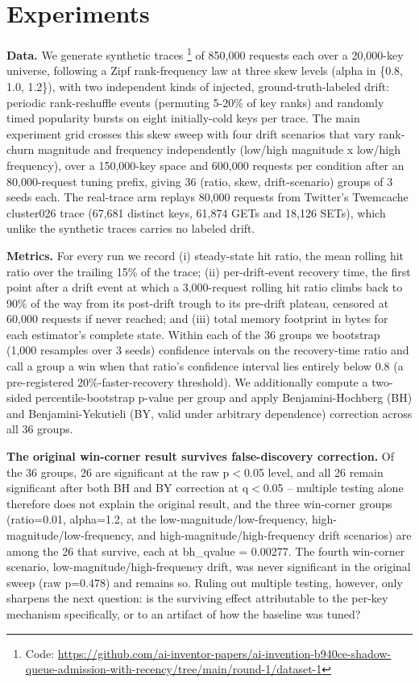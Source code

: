 \documentclass[11pt,letterpaper]{article}
\begin{document}
\section{Experiments}

\textbf{Data.} We generate synthetic traces \footnote{Code: \url{https://github.com/ai-inventor-papers/ai-invention-b940ce-shadow-queue-admission-with-recency/tree/main/round-1/dataset-1}} of 850,000 requests each over a 20,000-key universe, following a Zipf rank-frequency law at three skew levels (alpha in \{0.8, 1.0, 1.2\}), with two independent kinds of injected, ground-truth-labeled drift: periodic rank-reshuffle events (permuting 5-20\% of key ranks) and randomly timed popularity bursts on eight initially-cold keys per trace. The main experiment grid crosses this skew sweep with four drift scenarios that vary rank-churn magnitude and frequency independently (low/high magnitude x low/high frequency), over a 150,000-key space and 600,000 requests per condition after an 80,000-request tuning prefix, giving 36 (ratio, skew, drift-scenario) groups of 3 seeds each. The real-trace arm replays 80,000 requests from Twitter's Twemcache cluster026 trace (67,681 distinct keys, 61,874 GETs and 18,126 SETs), which unlike the synthetic traces carries no labeled drift.

\textbf{Metrics.} For every run we record (i) steady-state hit ratio, the mean rolling hit ratio over the trailing 15\% of the trace; (ii) per-drift-event recovery time, the first point after a drift event at which a 3,000-request rolling hit ratio climbs back to 90\% of the way from its post-drift trough to its pre-drift plateau, censored at 60,000 requests if never reached; and (iii) total memory footprint in bytes for each estimator's complete state. Within each of the 36 groups we bootstrap (1,000 resamples over 3 seeds) confidence intervals on the recovery-time ratio and call a group a win when that ratio's confidence interval lies entirely below 0.8 (a pre-registered 20\%-faster-recovery threshold). We additionally compute a two-sided percentile-bootstrap p-value per group and apply Benjamini-Hochberg (BH) and Benjamini-Yekutieli (BY, valid under arbitrary dependence) correction across all 36 groups.

\textbf{The original win-corner result survives false-discovery correction.} Of the 36 groups, 26 are significant at the raw p$<$0.05 level, and all 26 remain significant after both BH and BY correction at q$<$0.05 -- multiple testing alone therefore does not explain the original result, and the three win-corner groups (ratio=0.01, alpha=1.2, at the low-magnitude/low-frequency, high-magnitude/low-frequency, and high-magnitude/high-frequency drift scenarios) are among the 26 that survive, each at bh\_qvalue = 0.00277. The fourth win-corner scenario, low-magnitude/high-frequency drift, was never significant in the original sweep (raw p=0.478) and remains so. Ruling out multiple testing, however, only sharpens the next question: is the surviving effect attributable to the per-key mechanism specifically, or to an artifact of how the baseline was tuned?
\end{document}
